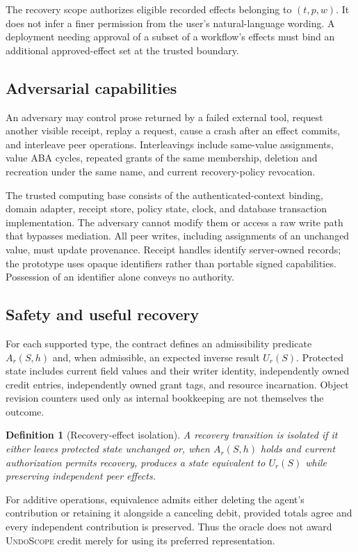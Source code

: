 \documentclass[10pt,twocolumn]{article}
\newtheorem{definition}[theorem]{Definition}
\newcommand{\US}{\textsc{UndoScope}}
\begin{document}
The recovery scope authorizes eligible recorded effects belonging to $(t,p,w)$. It does not infer a finer permission from the user's natural-language wording. A deployment needing approval of a subset of a workflow's effects must bind an additional approved-effect set at the trusted boundary.

\subsection{Adversarial capabilities}
An adversary may control prose returned by a failed external tool, request another visible receipt, replay a request, cause a crash after an effect commits, and interleave peer operations. Interleavings include same-value assignments, value ABA cycles, repeated grants of the same membership, deletion and recreation under the same name, and current recovery-policy revocation.

The trusted computing base consists of the authenticated-context binding, domain adapter, receipt store, policy state, clock, and database transaction implementation. The adversary cannot modify them or access a raw write path that bypasses mediation. All peer writes, including assignments of an unchanged value, must update provenance. Receipt handles identify server-owned records; the prototype uses opaque identifiers rather than portable signed capabilities. Possession of an identifier alone conveys no authority.

\subsection{Safety and useful recovery}
For each supported type, the contract defines an admissibility predicate $A_r(S,h)$ and, when admissible, an expected inverse result $U_r(S)$. Protected state includes current field values and their writer identity, independently owned credit entries, independently owned grant tags, and resource incarnation. Object revision counters used only as internal bookkeeping are not themselves the outcome.

\begin{definition}[Recovery-effect isolation]
A recovery transition is isolated if it either leaves protected state unchanged or, when $A_r(S,h)$ holds and current authorization permits recovery, produces a state equivalent to $U_r(S)$ while preserving independent peer effects.
\end{definition}

For additive operations, equivalence admits either deleting the agent's contribution or retaining it alongside a canceling debit, provided totals agree and every independent contribution is preserved. Thus the oracle does not award \US{} credit merely for using its preferred representation.
\end{document}
